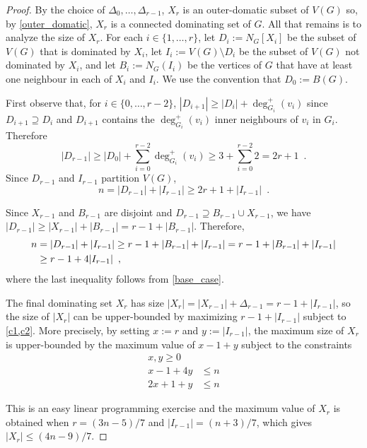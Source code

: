 \documentclass[12pt]{article}
\theoremstyle{definition}
\begin{document}
\begin{proof}
By the choice of $\Delta_0,\ldots,\Delta_{r-1}$, $X_r$ is an outer-domatic subset of $V(G)$ so, by \cref{outer_domatic}, $X_r$ is a connected dominating set of $G$.  All that remains is to analyze the size of $X_r$.  For each $i\in\{1,\ldots,r\}$, let $D_i:=N_G[X_i]$ be the subset of $V(G)$ that is dominated by $X_i$, let $I_i:=V(G)\setminus D_i$ be the subset of $V(G)$ not dominated by $X_i$, and let $B_i:=N_G(I_i)$ be the vertices of $G$ that have at least one neighbour in each of $X_i$ and $I_i$.  We use the convention that $D_0:=B(G)$.

First observe that, for $i\in\{0,\ldots,r-2\}$, $|D_{i+1}|\ge |D_i|+\deg_{G_i}^+(v_i)$ since $D_{i+1}\supseteq D_i$ and $D_{i+1}$ contains the $\deg_{G_i}^+(v_i)$ inner neighbours of $v_i$ in $G_i$.  Therefore
\[
    |D_{r-1}| \ge |D_0| + \sum_{i=0}^{r-2} \deg_{G_i}^+(v_i) \ge 3 + \sum_{i=0}^{r-2} 2 =  2r+1 \enspace . \label{double_d}
\]
Since $D_{r-1}$ and $I_{r-1}$ partition $V(G)$,
\begin{equation}
  n = |D_{r-1}| + |I_{r-1}| \ge 2r+1 + |I_{r-1}|  \enspace . \label{c1}
\end{equation}

Since $X_{r-1}$ and $B_{r-1}$ are disjoint and $D_{r-1}\supseteq B_{r-1}\cup X_{r-1}$, we have $|D_{r-1}|\ge |X_{r-1}| + |B_{r-1}|=r-1+|B_{r-1}|$.  Therefore,
\begin{align}
    n & = |D_{r-1}| + |I_{r-1}| \ge r-1 + |B_{r-1}| + |I_{r-1}| = r-1 + |B_{r-1}| + |I_{r-1}| \notag
    \\
    & \ge r - 1 + 4|I_{r-1}| \enspace , \label{c2}
\end{align}
where the last inequality follows from \cref{base_case}.

The final dominating set $X_r$ has size $|X_r| = |X_{r-1}| + \Delta_{r-1} = r - 1 +|I_{r-1}|$, so the size of $|X_r|$ can be upper-bounded by maximizing $r-1+|I_{r-1}|$ subject to \cref{c1,c2}.  More precisely, by setting $x:=r$ and $y:=|I_{r-1}|$, the maximum size of $X_r$ is upper-bounded by the maximum value of $x-1+y$ subject to the constraints
\begin{align*}
x,y \ge 0 \\
  x - 1 + 4y & \le n \\
  2x + 1 + y & \le n
\end{align*}

This is an easy linear programming exercise and the maximum value of $X_{r}$ is obtained when $r=(3n-5)/7$ and $|I_{r-1}|=(n+3)/7$, which gives
$|X_r| \le (4n-9)/7$.
\end{proof}
\end{document}
